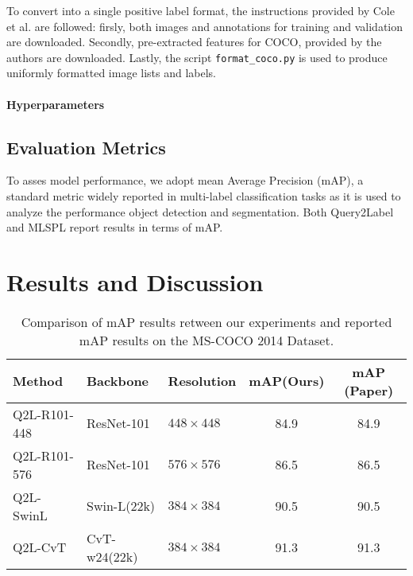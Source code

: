 \documentclass[lettersize,journal]{IEEEtran}
\begin{document}
\vspace{1em}

To convert into a single positive label format, the instructions provided by Cole et al. are followed: firsly, both images and annotations for training and validation are downloaded. Secondly, pre-extracted features for COCO, provided by the authors are downloaded. Lastly, the script \texttt{format\_coco.py} is used to produce uniformly formatted image lists and labels.

\vspace{1em}

\paragraph{Hyperparameters}

\subsection{Evaluation Metrics}
To asses model performance, we adopt mean Average Precision (mAP), a standard metric widely reported in multi-label classification tasks as it is used to analyze the performance object detection and segmentation. Both Query2Label and MLSPL report results in terms of mAP. 


\section{Results and Discussion}
\begin{table*}[!t]
    \small
    \caption{Comparison of mAP results retween our experiments and reported mAP results on the MS-COCO 2014 Dataset.}
    \label{tab:q2l_map_comparison}
    \centering
    \begin{tabular}{l l l c c}
    \toprule
    \textbf{Method} & \textbf{Backbone} & \textbf{Resolution} & \textbf{mAP(Ours)} & \textbf{mAP (Paper)} \\
    \midrule
    Q2L-R101-448 & ResNet-101     & $448\times448$ & 84.9 & 84.9 \\
    Q2L-R101-576 & ResNet-101     & $576\times576$ & 86.5 & 86.5 \\
    Q2L-SwinL    & Swin-L(22k)    & $384\times384$ & 90.5 & 90.5 \\
    Q2L-CvT      & CvT-w24(22k)   & $384\times384$ & 91.3 & 91.3 \\
    \bottomrule
    \end{tabular}
\end{table*}
\end{document}
